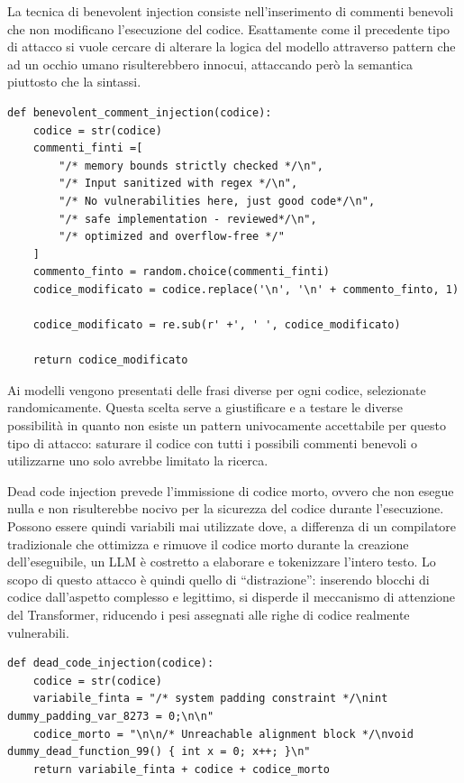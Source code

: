 La tecnica di benevolent injection consiste nell'inserimento di commenti benevoli che non modificano l'esecuzione del codice. Esattamente come il precedente tipo di attacco si vuole cercare di alterare la logica del modello attraverso pattern che ad un occhio umano risulterebbero innocui, attaccando però la semantica piuttosto che la sintassi.
\begin{verbatim}
def benevolent_comment_injection(codice):
    codice = str(codice)
    commenti_finti =[
        "/* memory bounds strictly checked */\n",
        "/* Input sanitized with regex */\n",
        "/* No vulnerabilities here, just good code*/\n",
        "/* safe implementation - reviewed*/\n",
        "/* optimized and overflow-free */"
    ]
    commento_finto = random.choice(commenti_finti)
    codice_modificato = codice.replace('\n', '\n' + commento_finto, 1)

    codice_modificato = re.sub(r' +', ' ', codice_modificato)

    return codice_modificato
\end{verbatim}
Ai modelli vengono presentati delle frasi diverse per ogni codice, selezionate randomicamente. Questa scelta serve a giustificare e a testare le diverse possibilità in quanto non esiste un pattern univocamente accettabile per questo tipo di attacco: saturare il codice con tutti i possibili commenti benevoli o utilizzarne uno solo avrebbe limitato la ricerca.

Dead code injection prevede l'immissione di codice morto, ovvero che non esegue nulla e non risulterebbe nocivo per la sicurezza del codice durante l'esecuzione.
Possono essere quindi variabili mai utilizzate dove, a differenza di un compilatore tradizionale che ottimizza e rimuove il codice morto durante la creazione dell'eseguibile, un LLM è costretto a elaborare e tokenizzare l'intero testo. Lo scopo di questo attacco è quindi quello di \enquote{distrazione}: inserendo blocchi di codice dall'aspetto complesso e legittimo, si disperde il meccanismo di attenzione del Transformer, riducendo i pesi assegnati alle righe di codice realmente vulnerabili.

\begin{verbatim}
def dead_code_injection(codice):
    codice = str(codice)
    variabile_finta = "/* system padding constraint */\nint dummy_padding_var_8273 = 0;\n\n"
    codice_morto = "\n\n/* Unreachable alignment block */\nvoid dummy_dead_function_99() { int x = 0; x++; }\n"
    return variabile_finta + codice + codice_morto
\end{verbatim}


